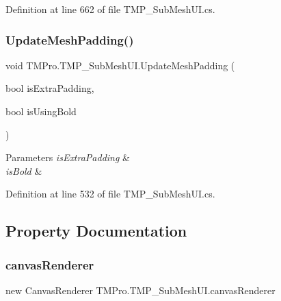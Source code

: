 Definition at line 662 of file T\+M\+P\+\_\+\+Sub\+Mesh\+U\+I.\+cs.

\mbox{\label{class_t_m_pro_1_1_t_m_p___sub_mesh_u_i_a0f39c16f271cb73553d4b1917a9fe4ba}} 
\subsubsection{\texorpdfstring{UpdateMeshPadding()}{UpdateMeshPadding()}}
{\footnotesize\ttfamily void T\+M\+Pro.\+T\+M\+P\+\_\+\+Sub\+Mesh\+U\+I.\+Update\+Mesh\+Padding (\begin{DoxyParamCaption}\item[{bool}]{is\+Extra\+Padding,  }\item[{bool}]{is\+Using\+Bold }\end{DoxyParamCaption})}






\begin{DoxyParams}{Parameters}
{\em is\+Extra\+Padding} & \\
\hline
{\em is\+Bold} & \\
\hline
\end{DoxyParams}


Definition at line 532 of file T\+M\+P\+\_\+\+Sub\+Mesh\+U\+I.\+cs.



\subsection{Property Documentation}
\mbox{\label{class_t_m_pro_1_1_t_m_p___sub_mesh_u_i_a4888f8c9e99911b05312c1ed5a578a33}} 
\subsubsection{\texorpdfstring{canvasRenderer}{canvasRenderer}}
{\footnotesize\ttfamily new Canvas\+Renderer T\+M\+Pro.\+T\+M\+P\+\_\+\+Sub\+Mesh\+U\+I.\+canvas\+Renderer\hspace{0.3cm}{\ttfamily [get]}}



